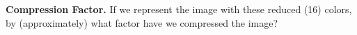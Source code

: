 \ifnum{} {
  \clearpage
} \fi
\item{}
\textbf{Compression Factor.}
If we represent the image with these reduced (16) colors, by
(approximately) what factor have we compressed the image?

\ifnum{} {
  
} \fi
